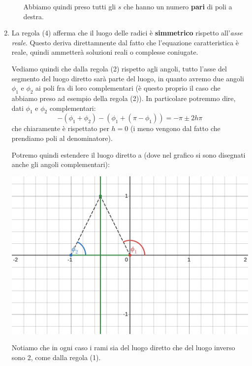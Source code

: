 \documentclass[a4paper,11pt]{article}
\begin{document}
\begin{enumerate}
\begin{itemize}
				Abbiamo quindi preso tutti gli $s$ che hanno un numero \textbf{pari} di poli a destra.
		\end{itemize}

	\item
		La regola (4) afferma che il luogo delle radici è \textbf{simmetrico} rispetto all'\textit{asse reale}.
		Questo deriva direttamnente dal fatto che l'equazione caratteristica è reale, quindi ammetterà soluzioni reali o complesse coniugate.

		Vediamo quindi che dalla regola (2) rispetto agli angoli, tutto l'asse del segmento del luogo diretto sarà parte del luogo, in quanto avremo due angoli $\phi_1$ e $\phi_2$ ai poli fra di loro complementari (è questo proprio il caso che abbiamo preso ad esempio della regola (2)).
		In particolare potremmo dire, dati $\phi_1$ e $\phi_2$ complementari:
		$$
		-(\phi_1 + \phi_2) -(\phi_1 + (\pi - \phi_1)) = -\pi \pm 2 h \pi
		$$
		che chiaramente è rispettato per $h = 0$ (i meno vengono dal fatto che prendiamo poli al denominatore).

		Potremo quindi estendere il luogo diretto a (dove nel grafico si sono disegnati anche gli angoli complementari):
		\begin{center}
			\includegraphics[scale=0.26]{../figures/locus_dc.png}
		\end{center}
		
		Notiamo che in ogni caso i rami sia del luogo diretto che del luogo inverso sono 2, come dalla regola (1).
\end{enumerate}
\end{document}
